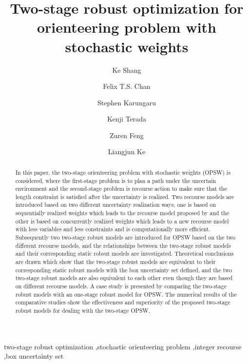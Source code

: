 \documentclass[preprint,review,10pt,round,authoryear]{elsarticle}\usepackage[]{graphicx}\usepackage[]{color}
\theoremstyle{plain}
\theoremstyle{definition}
\theoremstyle{remark}
\begin{document}
\begin{frontmatter}

\title{Two-stage robust optimization for orienteering problem with stochastic weights}

\author[institute1,institute3]{Ke Shang}
\author[institute2]{Felix T.S. Chan}
\author[institute1]{Stephen Karungaru}
\author[institute1]{Kenji Terada}
\author[institute3]{Zuren Feng}
\author[institute3]{Liangjun Ke}




\address[institute1]{Department of Information Science and Intelligent Systems, The University of Tokushima, Japan}
\address[institute3]{State Key Laboratory for Manufacturing Systems Engineering, Xi'an Jiaotong University, Xi'an, China}
\address[institute2]{Department of Industrial and Systems Engineering, The Hong Kong Polytechnic University, Hung Hom, Hong Kong}


\begin{abstract}
In this paper, the two-stage orienteering problem with stochastic weights (OPSW) is considered, where the first-stage problem is to plan a path under the uncertain environment and the second-stage problem is recourse action to make sure that the length constraint is satisfied after the uncertainty is realized. Two recourse models are introduced based on two different uncertainty realization ways, one is based on sequentially realized weights which leads to the recourse model proposed by \cite{evers2014two} and the other is based on concurrently realized weights which leads to a new recourse model with less variables and less constraints and is computationally more efficient. Subsequently two two-stage robust models are introduced for OPSW based on the two different recourse models, and the relationships between the two-stage robust models and their corresponding static robsut models are investigated. Theoretical conclusions are drawn which show that the two-stage robust models are equivalent to their corresponding static robust models with the box uncertainty set defined, and the two two-stage robust models are also equivalent to each other even though they are based on different recourse models. A case study is presented by comparing the two-stage robust models with an one-stage robust model for OPSW. The numerical results of the comparative studies show the effectiveness and superiority of the proposed two-stage robust models for dealing with the two-stage OPSW. 
\end{abstract}

\begin{keyword}
two-stage robust optimization \sep stochastic orienteering problem \sep integer recourse \sep box uncertainty set
\end{keyword}

\end{frontmatter}
\end{document}
